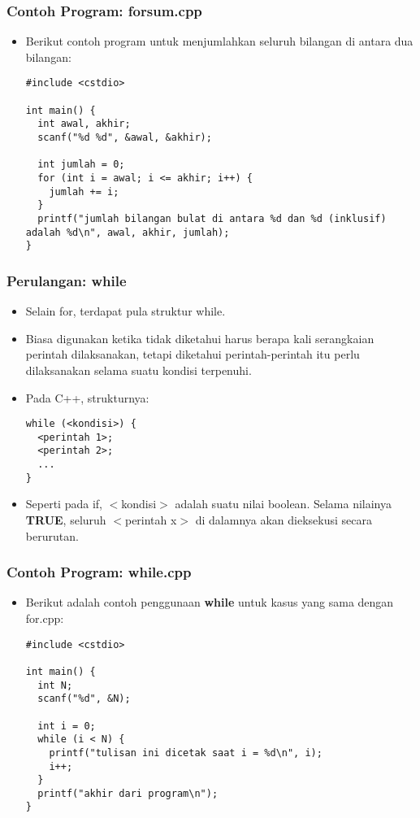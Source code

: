 \begin{frame}[fragile]
\frametitle{Contoh Program: forsum.cpp}
\begin{itemize}
  \item Berikut contoh program untuk menjumlahkan seluruh bilangan di antara dua bilangan:
\begin{lstlisting}
#include <cstdio>

int main() {
  int awal, akhir;
  scanf("%d %d", &awal, &akhir);

  int jumlah = 0;
  for (int i = awal; i <= akhir; i++) {
    jumlah += i;
  }
  printf("jumlah bilangan bulat di antara %d dan %d (inklusif) adalah %d\n", awal, akhir, jumlah);
}
\end{lstlisting}
\end{itemize}
\end{frame}

\begin{frame}[fragile]
\frametitle{Perulangan: while}
\begin{itemize}
  \item Selain for, terdapat pula struktur while.
  \item Biasa digunakan ketika tidak diketahui harus berapa kali serangkaian perintah dilaksanakan, tetapi diketahui perintah-perintah itu perlu dilaksanakan selama suatu kondisi terpenuhi.
  \item Pada C++, strukturnya:
\begin{lstlisting}
while (<kondisi>) {
  <perintah 1>;
  <perintah 2>;
  ...
}
\end{lstlisting}
  \item Seperti pada if, $<$kondisi$>$ adalah suatu nilai boolean. Selama nilainya \textbf{TRUE}, seluruh $<$perintah x$>$ di dalamnya akan dieksekusi secara berurutan.
\end{itemize}
\end{frame}

\begin{frame}[fragile]
\frametitle{Contoh Program: while.cpp}
\begin{itemize}
  \item Berikut adalah contoh penggunaan \textbf{while} untuk kasus yang sama dengan for.cpp:
\begin{lstlisting}
#include <cstdio>

int main() {
  int N;
  scanf("%d", &N);

  int i = 0;
  while (i < N) {
    printf("tulisan ini dicetak saat i = %d\n", i);
    i++;
  }
  printf("akhir dari program\n");
}
\end{lstlisting}
\end{itemize}
\end{frame}

